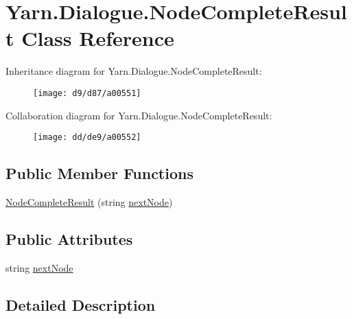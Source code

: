 \hypertarget{a00113}{\section{Yarn.\-Dialogue.\-Node\-Complete\-Result Class Reference}
\label{a00113}
}


Inheritance diagram for Yarn.\-Dialogue.\-Node\-Complete\-Result\-:
\nopagebreak
\begin{figure}[H]
\begin{center}
\leavevmode
\texttt{[image: d9/d87/a00551]}
\end{center}
\end{figure}


Collaboration diagram for Yarn.\-Dialogue.\-Node\-Complete\-Result\-:
\nopagebreak
\begin{figure}[H]
\begin{center}
\leavevmode
\texttt{[image: dd/de9/a00552]}
\end{center}
\end{figure}
\subsection*{Public Member Functions}
\begin{DoxyCompactItemize}
\item 
\hyperlink{a00113_a88c81469a69987c05aa92780c5a5c1f9}{Node\-Complete\-Result} (string \hyperlink{a00113_ad48b37b51066b94cd48c58626ac0e774}{next\-Node})
\end{DoxyCompactItemize}
\subsection*{Public Attributes}
\begin{DoxyCompactItemize}
\item 
string \hyperlink{a00113_ad48b37b51066b94cd48c58626ac0e774}{next\-Node}
\end{DoxyCompactItemize}


\subsection{Detailed Description}


